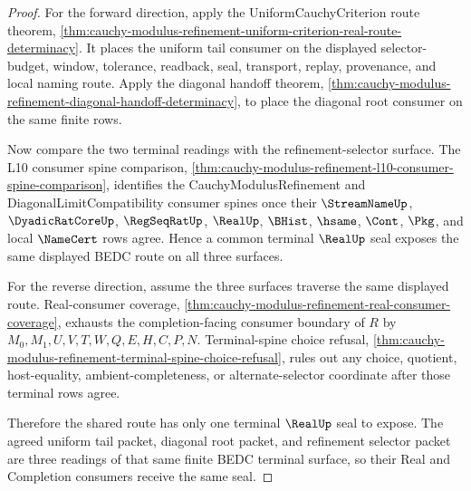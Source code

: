 \begin{proof}
For the forward direction, apply the UniformCauchyCriterion route theorem, \autoref{thm:cauchy-modulus-refinement-uniform-criterion-real-route-determinacy}. It places the uniform tail consumer on the displayed selector-budget, window, tolerance, readback, seal, transport, replay, provenance, and local naming route. Apply the diagonal handoff theorem, \autoref{thm:cauchy-modulus-refinement-diagonal-handoff-determinacy}, to place the diagonal root consumer on the same finite rows.

Now compare the two terminal readings with the refinement-selector surface. The L10 consumer spine comparison, \autoref{thm:cauchy-modulus-refinement-l10-consumer-spine-comparison}, identifies the CauchyModulusRefinement and DiagonalLimitCompatibility consumer spines once their $\StreamNameUp$, $\DyadicRatCoreUp$, $\RegSeqRatUp$, $\RealUp$, $\BHist$, $\hsame$, $\Cont$, $\Pkg$, and local $\NameCert$ rows agree. Hence a common terminal $\RealUp$ seal exposes the same displayed BEDC route on all three surfaces.

For the reverse direction, assume the three surfaces traverse the same displayed route. Real-consumer coverage, \autoref{thm:cauchy-modulus-refinement-real-consumer-coverage}, exhausts the completion-facing consumer boundary of $R$ by $M_0,M_1,U,V,T,W,Q,E,H,C,P,N$. Terminal-spine choice refusal, \autoref{thm:cauchy-modulus-refinement-terminal-spine-choice-refusal}, rules out any choice, quotient, host-equality, ambient-completeness, or alternate-selector coordinate after those terminal rows agree.

Therefore the shared route has only one terminal $\RealUp$ seal to expose. The agreed uniform tail packet, diagonal root packet, and refinement selector packet are three readings of that same finite BEDC terminal surface, so their Real and Completion consumers receive the same seal.
\end{proof}

